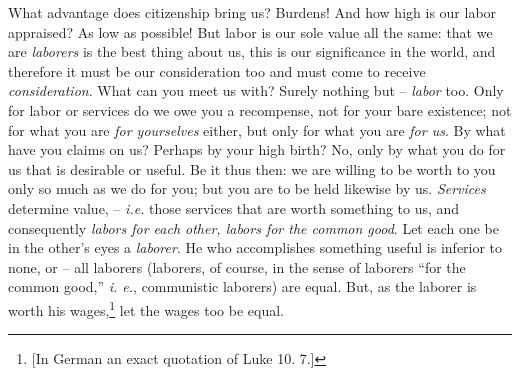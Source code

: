 \documentclass[12pt,a4paper]{book}
\begin{document}
What advantage does citizenship bring us? Burdens! And how high is our labor 
appraised? As low as possible! But labor is our sole value all the same: that 
we are \textit{laborers} is the best thing about us, this is our significance 
in the world, and therefore it must be our consideration too and must come to 
receive \textit{consideration}. What can you meet us with? Surely nothing but 
-- \textit{labor} too. Only for labor or services do we owe you a recompense, 
not for your bare existence; not for what you are \textit{for yourselves} 
either, but only for what you are \textit{for us}. By what have you claims on 
us? Perhaps by your high birth? No, only by what you do for us that is 
desirable or useful. Be it thus then: we are willing to be worth to you only 
so much as we do for you; but you are to be held likewise by us. 
\textit{Services} determine value, -- \textit{i.e.} those services that are 
worth something to us, and consequently \textit{labors for each other, labors 
for the common good}. Let each one be in the other's eyes a \textit{laborer}. 
He who accomplishes something useful is inferior to none, or -- all laborers 
(laborers, of course, in the sense of laborers ``for the common good,'' 
\textit{i. e.}, communistic laborers) are equal. But, as the laborer is worth 
his wages,\footnote{[In German an exact quotation of Luke 10. 7.]} let the 
wages too be equal.
\end{document}
